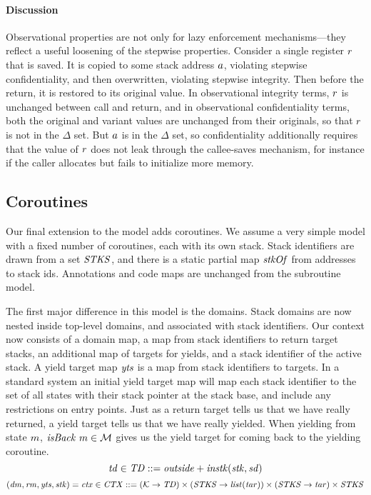 \documentclass[acmsmall,review,anonymous]{acmart}\settopmatter{printfolios=true,printccs=false,printacmref=false}
\begin{document}
{{\paragraph{Discussion}

Observational properties are not only for lazy enforcement mechanisms---they reflect a useful
loosening of the stepwise properties. Consider a single register \(r\) that is saved.
It is copied to some stack address \(a\), violating stepwise confidentiality, and then
overwritten, violating stepwise integrity. Then before the return, it is restored to its
original value. In observational integrity terms, \(r\) is unchanged between call and return,
and in observational confidentiality terms, both the original and variant values are unchanged
from their originals, so that \(r\) is not in the \(\Delta\) set.  But \(a\) is in the
\(\Delta\) set, so confidentiality additionally requires that the value of \(r\) does not
leak through the callee-saves mechanism, for instance if the caller allocates but fails to
initialize more memory.

\subsection{Coroutines}
\label{sec:coroutines}

Our final extension to the model adds coroutines. We assume a very simple model with
a fixed number of coroutines, each with its own stack.
Stack identifiers are drawn from a set \(\mathit{STKS}\), and there is a static partial map
\(\mathit{stkOf}\) from addresses to stack ids.  Annotations and code maps are unchanged from
the subroutine model.

The first major difference in this model is the domains. Stack domains are now nested inside
top-level domains, and associated with stack identifiers.
Our context now consists of a domain map, a map from stack identifiers to return target stacks,
an additional map of targets for yields, and a stack identifier of the active stack.
A yield target map \(\mathit{yts}\) is a map from stack identifiers to targets.
In a standard system an initial yield target map will map each stack identifier to the
set of all states with their stack pointer at the stack base, and include any restrictions
on entry points. Just as a return target tells us that we have really returned, a yield
target tells us that we have really yielded. When yielding from state \(m\),
\(\mathit{isBack} ~ m \in {\mathcal M}\) gives us the yield target for coming back to the yielding
coroutine.
%
\[\mathit{td} \in \mathit{TD} ::= \mathit{outside} + \mathit{instk}(\mathit{stk},\mathit{sd})\]
\[(\mathit{dm},\mathit{rm},\mathit{yts},\mathit{stk}) = \mathit{ctx} \in \mathit{CTX} ::=
 ({\mathcal K} \rightarrow \mathit{TD}) \times
(\mathit{STKS} \rightarrow \mathit{list}(\mathit{tar})) \times (\mathit{STKS} \rightarrow \mathit{tar}) \times \mathit{STKS}\]

}}
\end{document}
